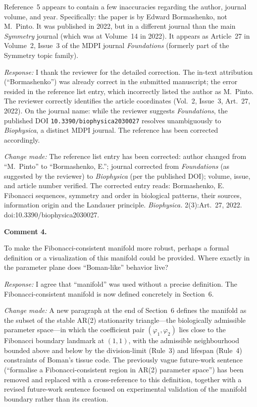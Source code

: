 \documentclass[12pt,a4paper]{article}
\newcommand{\point}[1]{\medskip\noindent\textbf{Comment #1.}\enspace}
\newcommand{\response}{\noindent\textit{Response:}\enspace}
\newcommand{\change}{\noindent\textit{Change made:}\enspace}
\begin{document}
\begin{reviewbox}
Reference~5 appears to contain a few inaccuracies regarding the author,
journal volume, and year. Specifically: the paper is by Edward
Bormashenko, not M.\ Pinto. It was published in 2022, but in a
different journal than the main \textit{Symmetry} journal (which was at
Volume~14 in 2022). It appears as Article~27 in Volume~2, Issue~3 of
the MDPI journal \textit{Foundations} (formerly part of the Symmetry
topic family).
\end{reviewbox}

\response
I thank the reviewer for the detailed correction.
The in-text attribution (``Bormashenko'') was already correct in the
submitted manuscript; the error resided in the reference list entry,
which incorrectly listed the author as M.\ Pinto.
The reviewer correctly identifies the article coordinates
(Vol.~2, Issue~3, Art.~27, 2022).
On the journal name: while the reviewer suggests \textit{Foundations},
the published DOI \texttt{10.3390/biophysica2030027} resolves
unambiguously to \textit{Biophysica}, a distinct MDPI journal.
The reference has been corrected accordingly.

\change
The reference list entry has been corrected: author changed from
``M.\ Pinto'' to ``Bormashenko, E.''; journal corrected from
\textit{Foundations} (as suggested by the reviewer) to
\textit{Biophysica} (per the published DOI);
volume, issue, and article number verified.
The corrected entry reads:
Bormashenko, E. Fibonacci sequences, symmetry and order in biological
patterns, their sources, information origin and the Landauer principle.
\textit{Biophysica.} 2(3):Art.\ 27, 2022.
doi:10.3390/biophysica2030027.

\point{4}

\begin{reviewbox}
To make the Fibonacci-consistent manifold more robust, perhaps a formal
definition or a visualization of this manifold could be provided. Where
exactly in the parameter plane does ``Boman-like'' behavior live?
\end{reviewbox}

\response
I agree that ``manifold'' was used without a precise definition.
The Fibonacci-consistent manifold is now defined concretely in
Section~6.

\change
A new paragraph at the end of Section~6 defines the manifold as the
subset of the stable AR(2) stationarity triangle---the biologically
admissible parameter space---in which the coefficient pair
$(\varphi_1,\varphi_2)$ lies close to the Fibonacci boundary landmark
at $(1,1)$, with the admissible neighbourhood bounded above and below
by the division-limit (Rule~3) and lifespan (Rule~4) constraints of
Boman's tissue code.
The previously vague future-work sentence (``formalise a
Fibonacci-consistent region in AR(2) parameter space'') has been removed
and replaced with a cross-reference to this definition, together with a
revised future-work sentence focused on experimental validation of the
manifold boundary rather than its creation.
\end{document}
